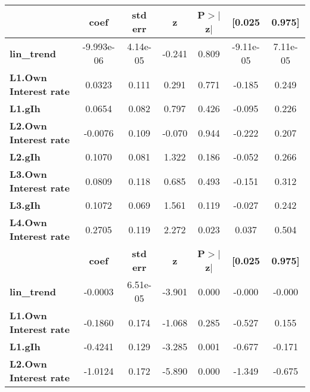 \begin{center}
\begin{tabular}{lcccccc}
\toprule
                              & \textbf{coef} & \textbf{std err} & \textbf{z} & \textbf{P$> |$z$|$} & \textbf{[0.025} & \textbf{0.975]}  \\
\midrule
\textbf{lin\_trend}           &   -9.993e-06  &     4.14e-05     &    -0.241  &         0.809        &    -9.11e-05    &     7.11e-05     \\
\textbf{L1.Own Interest rate} &       0.0323  &        0.111     &     0.291  &         0.771        &       -0.185    &        0.249     \\
\textbf{L1.gIh}               &       0.0654  &        0.082     &     0.797  &         0.426        &       -0.095    &        0.226     \\
\textbf{L2.Own Interest rate} &      -0.0076  &        0.109     &    -0.070  &         0.944        &       -0.222    &        0.207     \\
\textbf{L2.gIh}               &       0.1070  &        0.081     &     1.322  &         0.186        &       -0.052    &        0.266     \\
\textbf{L3.Own Interest rate} &       0.0809  &        0.118     &     0.685  &         0.493        &       -0.151    &        0.312     \\
\textbf{L3.gIh}               &       0.1072  &        0.069     &     1.561  &         0.119        &       -0.027    &        0.242     \\
\textbf{L4.Own Interest rate} &       0.2705  &        0.119     &     2.272  &         0.023        &        0.037    &        0.504     \\
                              & \textbf{coef} & \textbf{std err} & \textbf{z} & \textbf{P$> |$z$|$} & \textbf{[0.025} & \textbf{0.975]}  \\
\midrule
\textbf{lin\_trend}           &      -0.0003  &     6.51e-05     &    -3.901  &         0.000        &       -0.000    &       -0.000     \\
\textbf{L1.Own Interest rate} &      -0.1860  &        0.174     &    -1.068  &         0.285        &       -0.527    &        0.155     \\
\textbf{L1.gIh}               &      -0.4241  &        0.129     &    -3.285  &         0.001        &       -0.677    &       -0.171     \\
\textbf{L2.Own Interest rate} &      -1.0124  &        0.172     &    -5.890  &         0.000        &       -1.349    &       -0.675     \\

\end{tabular}
\end{center}
